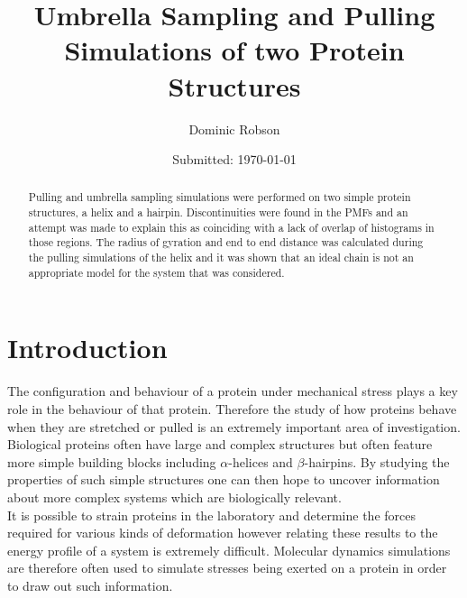 \documentclass[12pt, onecolumn]{revtex4}    %
\begin{document}
                     


\title{Umbrella Sampling and Pulling Simulations of two Protein Structures} 
\date{Submitted: \today{}}
\author{Dominic Robson}


\begin{abstract}              

Pulling and umbrella sampling simulations were performed on two simple protein structures, a helix and a hairpin.  Discontinuities were found in the PMFs and an attempt was made to explain this as coinciding with a lack of overlap of histograms in those regions.  The radius of gyration and end to end distance was calculated during the pulling simulations of the helix and it was shown that an ideal chain is not an appropriate model for the system that was considered.

\end{abstract}

\maketitle

\tableofcontents

\newpage

\section{Introduction}

The configuration and behaviour of a protein under mechanical stress plays a key role in the behaviour of that protein\cite{StretchWhy}.  Therefore the study of how proteins behave when they are stretched or pulled is an extremely important area of investigation.\\

Biological proteins often have large and complex structures but often feature more simple building blocks including $\alpha$-helices and $\beta$-hairpins\cite{Chig}.  By studying the properties of such simple structures one can then hope to uncover information about more complex systems which are biologically relevant.\\

It is possible to strain proteins in the laboratory and determine the forces required for various kinds of deformation however relating these results to the energy profile of a system is extremely difficult\cite{MDWhy}.  Molecular dynamics simulations are therefore often used to simulate stresses being exerted on a protein in order to draw out such information\cite{MDWhy}.\\
\end{document}
